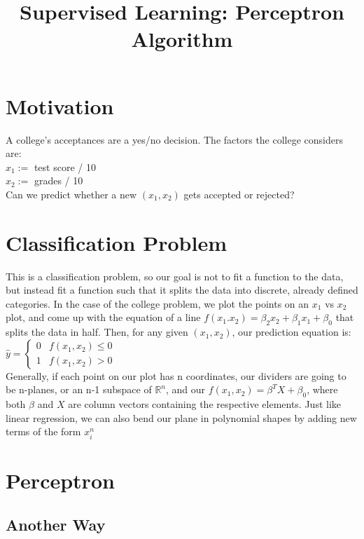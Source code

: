 \documentclass{article}
\title{Supervised Learning: Perceptron Algorithm}
\begin{document}
\maketitle
\section{Motivation}
A college's acceptances are a yes/no decision. The factors the college considers are:\\
$x_1:=$ test score / 10\\
$x_2:=$ grades / 10\\

Can we predict whether a new $(x_1, x_2)$ gets accepted or rejected?

\section{Classification Problem}
This is a classification problem, so our goal is not to fit a function to the data, but instead fit a function such that it splits the data into discrete, already defined categories. In the case of the college problem, we plot the points on an $x_1$ vs $x_2$ plot, and come up with the equation of a line $f(x_1.x_2) = \beta_2 x_2 + \beta_1 x_1 + \beta_0$ that splits the data in half. Then, for any given $(x_1,x_2)$, our prediction equation is: \\
$\hat{y} = 
\begin{cases} 
0 & f(x_1, x_2) \le 0 \\
1 & f(x_1, x_2) > 0 
\end{cases}
$\\
Generally, if each point on our plot has n coordinates, our dividers are going to be n-planes, or an n-1 subspace of $\mathbb{R}^n$, and our $f(x_1, x_2) = \beta^T X + \beta_0$, where both $\beta$ and $X$ are column vectors containing the respective elements. Just like linear regression, we can also bend our plane in polynomial shapes by adding new terms of the form $x_{i}^n$
\section{Perceptron}

\subsection{Another Way}
\end{document}
